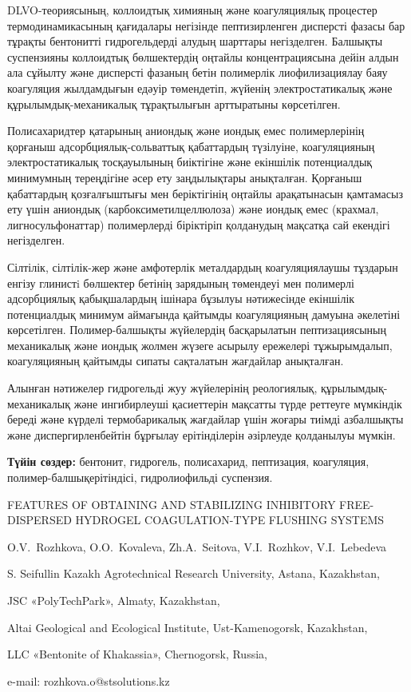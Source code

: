 DLVO-теориясының, коллоидтық химияның және коагуляциялық процестер
термодинамикасының қағидалары негізінде пептизирленген дисперсті фазасы
бар тұрақты бентонитті гидрогельдерді алудың шарттары негізделген.
Балшықты суспензияны коллоидтық бөлшектердің оңтайлы концентрациясына
дейін алдын ала сұйылту және дисперсті фазаның бетін полимерлік
лиофилизациялау баяу коагуляция жылдамдығын едәуір төмендетіп, жүйенің
электростатикалық және құрылымдық-механикалық тұрақтылығын арттыратыны
көрсетілген.

Полисахаридтер қатарының аниондық және иондық емес полимерлерінің
қорғаныш адсорбция\-лық-сольваттық қабаттардың түзілуіне, коагуляцияның
электростатикалық тосқауылының биіктігіне және екіншілік потенциалдық
минимумның тереңдігіне әсер ету заңдылықтары анықталған. Қорғаныш
қабаттардың қозғалғыштығы мен беріктігінің оңтайлы арақатынасын
қамтамасыз ету үшін аниондық (карбоксиметилцеллюлоза) және иондық емес
(крахмал, лигносульфонаттар) полимерлерді біріктіріп қолданудың мақсатқа
сай екендігі негізделген.

Сілтілік, сілтілік-жер және амфотерлік металдардың коагуляциялаушы
тұздарын енгізу глинистi бөлшектер бетінің зарядының төмендеуі мен
полимерлі адсорбциялық қабықшалардың ішінара бұзылуы нәтижесінде
екіншілік потенциалдық минимум аймағында қайтымды коагуляцияның дамуына
әкелетіні көрсетілген. Полимер-балшықты жүйелердің басқарылатын
пептизациясының механикалық және иондық жолмен жүзеге асырылу ережелері
тұжырымдалып, коагуляцияның қайтымды сипаты сақталатын жағдайлар
анықталған.

Алынған нәтижелер гидрогельді жуу жүйелерінің реологиялық,
құрылымдық-механикалық және ингибирлеуші қасиеттерін мақсатты түрде
реттеуге мүмкіндік береді және күрделі термобарикалық жағдайлар үшін
жоғары тиімді азбалшықты және диспергирленбейтін бұрғылау ерітінділерін
әзірлеуде қолданылуы мүмкін.

{\bfseries Түйін сөздер:} бентонит, гидрогель, полисахарид,
пептизация, коагуляция, полимер-балшықері\-тіндісі, гидролиофильді
суспензия.

\begin{header}
FEATURES OF OBTAINING AND STABILIZING INHIBITORY FREE-DISPERSED HYDROGEL COAGULATION-TYPE FLUSHING SYSTEMS

O.V.~Rozhkova\envelope,
O.O.~Kovaleva,
Zh.A.~Seitova,
V.I.~Rozhkov,
V.I.~Lebedeva
\end{header}

\begin{affil}
S. Seifullin Kazakh Agrotechnical Research University, Astana, Kazakhstan,

JSC «PolyTechPark», Almaty, Kazakhstan,

Altai Geological and Ecological Institute, Ust-Kamenogorsk, Kazakhstan,

LLC «Bentonite of Khakassia», Chernogorsk, Russia,

e-mail: rozhkova.o@stsolutions.kz
\end{affil}

